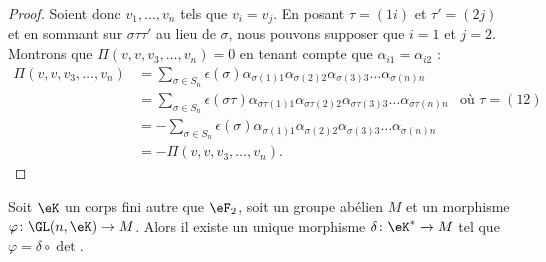 \begin{proof}
    Soient donc \( v_1,\ldots, v_n\) tels que \( v_i=v_j\). En posant \( \tau=(1i)\) et \( \tau'=(2j)\) et en sommant sur \( \sigma\tau\tau'\) au lieu de \( \sigma\), nous pouvons supposer que \( i=1\) et \( j=2\). Montrons que \( \Pi(v,v,v_3,\ldots, v_n)=0\) en tenant compte que \( \alpha_{i1}=\alpha_{i2}\) :
    \begin{subequations}
        \begin{align}
            \Pi(v,v,v_3,\ldots, v_n)&=\sum_{\sigma\in S_n}\epsilon(\sigma)\alpha_{\sigma(1)1}\alpha_{\sigma(2)2}\alpha_{\sigma(3)3}\ldots \alpha_{\sigma(n)n}\\
            &=\sum_{\sigma\in S_n}\epsilon(\sigma\tau)\alpha_{\sigma\tau(1)1}\alpha_{\sigma\tau(2)2}\alpha_{\sigma\tau(3)3}\ldots \alpha_{\sigma\tau(n)n}&\text{où } \tau=(12)\\
            &=-\sum_{\sigma\in S_n}\epsilon(\sigma)\alpha_{\sigma(1)1}\alpha_{\sigma(2)2}\alpha_{\sigma(3)3}\ldots \alpha_{\sigma(n)n} \\
            &=-\Pi(v,v,v_3,\ldots, v_n).
        \end{align}
    \end{subequations}
\end{proof}

\begin{lemma}   \label{LemcDOTzM}
    Soit \( \eK\) un corps fini autre que \( \eF_2\), soit un groupe abélien \( M\) et un morphisme \( \varphi\colon \GL(n,\eK)\to M\). Alors il existe un unique morphisme \( \delta\colon \eK^*\to M\) tel que \( \varphi=\delta\circ\det\).
\end{lemma}


